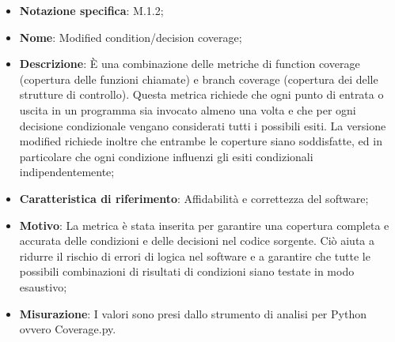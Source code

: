 \begin{itemize}
    \item \textbf{Notazione specifica}: M.1.2;
    \item \textbf{Nome}: Modified condition/decision coverage;
    \item \textbf{Descrizione}: È una combinazione delle metriche di function coverage (copertura delle funzioni chiamate) e branch coverage (copertura dei  delle strutture di controllo). Questa metrica richiede che ogni punto di entrata o uscita in un programma sia invocato almeno una volta e che per ogni decisione condizionale vengano considerati tutti i possibili esiti. La versione modified richiede inoltre che entrambe le coperture siano soddisfatte, ed in particolare che ogni condizione influenzi gli esiti condizionali indipendentemente;
    \item \textbf{Caratteristica di riferimento}: Affidabilità e correttezza del software;
    \item \textbf{Motivo}: La metrica è stata inserita per garantire una copertura completa e accurata delle condizioni e delle decisioni nel codice sorgente. Ciò aiuta a ridurre il rischio di errori di logica nel software e a garantire che tutte le possibili combinazioni di risultati di condizioni siano testate in modo esaustivo;
    \item \textbf{Misurazione}: I valori sono presi dallo strumento di analisi per Python ovvero Coverage.py.

\end{itemize}
